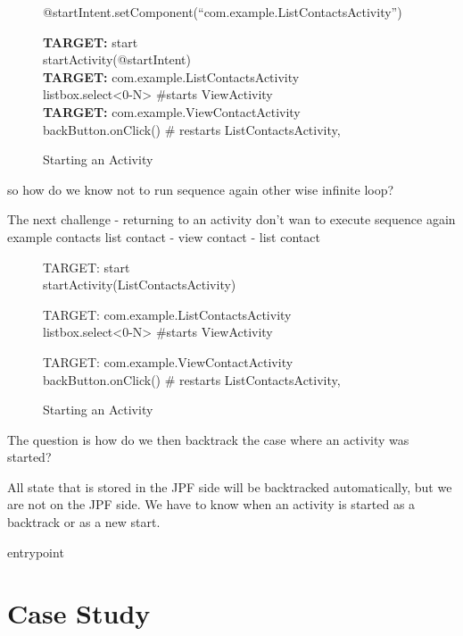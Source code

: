 \documentclass{acm_proc_article-sp}
\begin{document}
\begin{figure}
{\small
{\sf 
@startIntent.setComponent(``com.example.ListContactsActivity'')

\textbf{TARGET:} start\\
startActivity(@startIntent)\\

\textbf{TARGET:} com.example.ListContactsActivity\\
listbox.select<0-N> \#starts ViewActivity\\

\textbf{TARGET:} com.example.ViewContactActivity\\
backButton.onClick() \# restarts ListContactsActivity, \\
   
}
}
\caption{Starting an Activity}
\end{figure}
so how do we know not to run sequence again other wise infinite loop?




The next challenge 
-  returning to an activity don't wan to execute sequence again example contacts list contact - view contact - list contact

\begin{figure}
{\small
{\sf 
TARGET: start\\
  startActivity(ListContactsActivity)

TARGET: com.example.ListContactsActivity\\
  listbox.select<0-N> \#starts ViewActivity

TARGET: com.example.ViewContactActivity\\
   backButton.onClick() \# restarts ListContactsActivity, 
}
}
\caption{Starting an Activity}
\end{figure}








The question is how do we then backtrack the case where an activity was started?

All state that is stored in the JPF side will be backtracked automatically, but we are not on the JPF side. We have to know when an
activity is started as a backtrack or as a new start. 






entrypoint 
\newpage
\section{Case Study}
\end{document}
